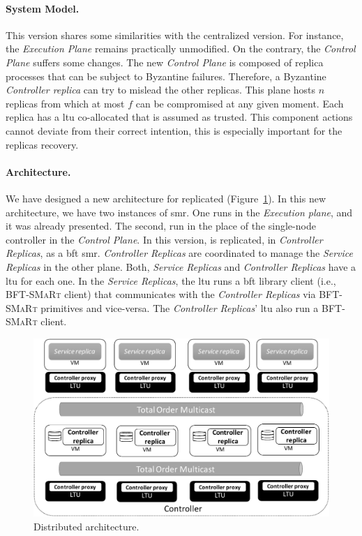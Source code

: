\paragraph{System Model.}
This version \system shares some similarities with the centralized version.
For instance, the \emph{Execution Plane} remains practically unmodified.
On the contrary, the \emph{Control Plane} suffers some changes.
The new \emph{Control Plane} is composed of replica processes that can be subject to Byzantine failures.
Therefore, a Byzantine \emph{Controller replica} can try to mislead the other replicas.
This plane hosts $n$ replicas from which at most $f$ can be compromised at any given moment.
Each replica has a \gls{ltu} co-allocated that is assumed as trusted. 
This component actions cannot deviate from their correct intention, this is especially important for the replicas recovery.


\paragraph{Architecture.}
We have designed a new architecture for replicated \system (Figure~\ref{fig:lazarus_distributed}). 
In this new architecture, we have two instances of \gls{smr}.
One runs in the \emph{Execution plane}, and it was already presented.
The second, run in the place of the single-node controller in the \emph{Control Plane}.
In this version, \system is replicated, in \emph{Controller Replicas}, as a \gls{bft} \gls{smr}.
\emph{Controller Replicas} are coordinated to manage the \emph{Service Replicas} in the other plane.
Both, \emph{Service Replicas} and \emph{Controller Replicas} have a \gls{ltu} for each one.
In the \emph{Service Replicas}, the \gls{ltu} runs a \gls{bft} library client (i.e., \textsc{BFT-SMaRt} client) that communicates with the \emph{Controller Replicas} via \textsc{BFT-SMaRt} primitives and vice-versa.
The \emph{Controller Replicas}' \gls{ltu} also run a \textsc{BFT-SMaRt} client.


\begin{figure}[h]
\begin{center}
\includegraphics[width=0.7\columnwidth]{images/images/lazarus_distributed.pdf}
\caption{Distributed \system architecture.}
\label{fig:lazarus_distributed}
\end{center}
\end{figure}

